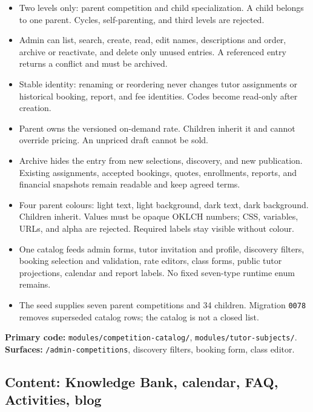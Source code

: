 \documentclass[11pt,a4paper]{article}
\newcommand{\code}[1]{\texttt{#1}}
\begin{document}
\begin{itemize}
	\item Two levels only: parent competition and child specialization. A child belongs to one parent. Cycles, self-parenting, and third levels are rejected.
	\item Admin can list, search, create, read, edit names, descriptions and order, archive or reactivate, and delete only unused entries. A referenced entry returns a conflict and must be archived.
	\item Stable identity: renaming or reordering never changes tutor assignments or historical booking, report, and fee identities. Codes become read-only after creation.
	\item Parent owns the versioned on-demand rate. Children inherit it and cannot override pricing. An unpriced draft cannot be sold.
	\item Archive hides the entry from new selections, discovery, and new publication. Existing assignments, accepted bookings, quotes, enrollments, reports, and financial snapshots remain readable and keep agreed terms.
	\item Four parent colours: light text, light background, dark text, dark background. Children inherit. Values must be opaque OKLCH numbers; CSS, variables, URLs, and alpha are rejected. Required labels stay visible without colour.
	\item One catalog feeds admin forms, tutor invitation and profile, discovery filters, booking selection and validation, rate editors, class forms, public tutor projections, calendar and report labels. No fixed seven-type runtime enum remains.
	\item The seed supplies seven parent competitions and 34 children. Migration \code{0078} removes superseded catalog rows; the catalog is not a closed list.
\end{itemize}

\noindent\textbf{Primary code:} \code{modules/competition-catalog/}, \code{modules/tutor-subjects/}. \textbf{Surfaces:} \code{/admin-competitions}, discovery filters, booking form, class editor.

\subsection{Content: Knowledge Bank, calendar, FAQ, Activities, blog}
\end{document}

